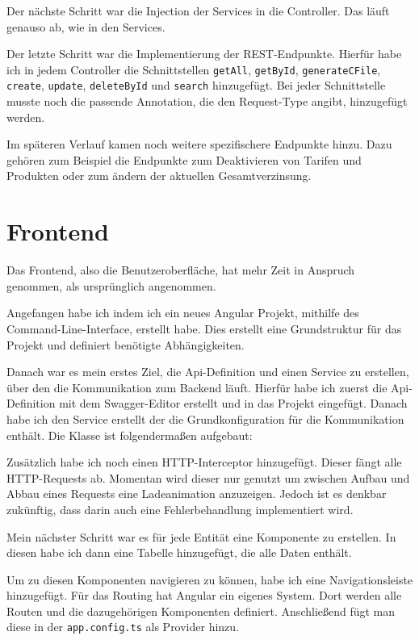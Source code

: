 Der nächste Schritt war die Injection der Services in die Controller. Das läuft genauso ab, wie in den Services.

Der letzte Schritt war die Implementierung der REST-Endpunkte. Hierfür habe ich in jedem Controller die Schnittstellen \texttt{getAll}, \texttt{getById}, \texttt{generateCFile}, \texttt{create}, \texttt{update}, 
\texttt{deleteById} und \texttt{search} hinzugefügt.
Bei jeder Schnittstelle musste noch die passende Annotation, die den Request-Type angibt, hinzugefügt werden.

Im späteren Verlauf kamen noch weitere spezifischere Endpunkte hinzu. Dazu gehören zum Beispiel die Endpunkte zum Deaktivieren von Tarifen und Produkten oder 
zum ändern der aktuellen Gesamtverzinsung.
\section{Frontend}
Das Frontend, also die Benutzeroberfläche, hat mehr Zeit in Anspruch genommen, als ursprünglich angenommen.

Angefangen habe ich indem ich ein neues Angular Projekt, mithilfe des Command-Line-Interface, erstellt habe. Dies erstellt eine Grundstruktur für das Projekt und definiert benötigte Abhängigkeiten.

Danach war es mein erstes Ziel, die Api-Definition und einen Service zu erstellen, über den die Kommunikation zum Backend läuft. Hierfür habe ich zuerst die Api-Definition mit dem Swagger-Editor erstellt und in 
das Projekt eingefügt. Danach habe ich den Service erstellt der die Grundkonfiguration für die Kommunikation enthält.
Die Klasse ist folgendermaßen aufgebaut:


Zusätzlich habe ich noch einen HTTP-Interceptor hinzugefügt. Dieser fängt alle HTTP-Requests ab. Momentan wird dieser nur genutzt um zwischen 
Aufbau und Abbau eines Requests eine Ladeanimation anzuzeigen. Jedoch ist es denkbar zukünftig, dass darin auch eine Fehlerbehandlung implementiert wird.

Mein nächster Schritt war es für jede Entität eine Komponente zu erstellen. In diesen habe ich dann eine Tabelle hinzugefügt, die alle Daten enthält.

Um zu diesen Komponenten navigieren zu können, habe ich eine Navigationsleiste hinzugefügt. Für das Routing hat Angular ein eigenes System. Dort werden alle Routen
und die dazugehörigen Komponenten definiert. Anschließend fügt man diese in der \texttt{app.config.ts} als Provider hinzu.

